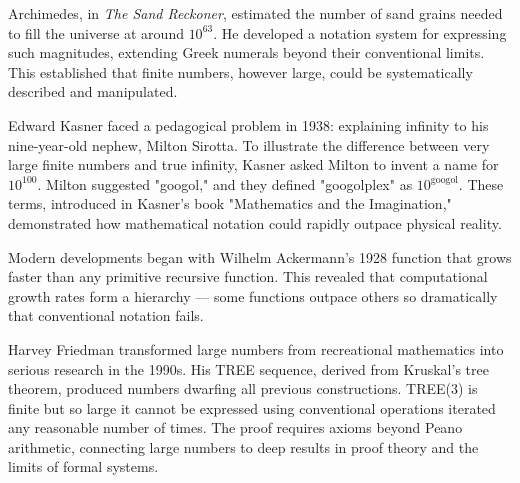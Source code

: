 Archimedes, in \textit{The Sand Reckoner}, estimated the number of sand grains needed to fill the universe at around $10^{63}$. He developed a notation system for expressing such magnitudes, extending Greek numerals beyond their conventional limits. This established that finite numbers, however large, could be systematically described and manipulated.

Edward Kasner faced a pedagogical problem in 1938: explaining infinity to his nine-year-old nephew, Milton Sirotta. To illustrate the difference between very large finite numbers and true infinity, Kasner asked Milton to invent a name for $10^{100}$. Milton suggested "googol," and they defined "googolplex" as $10^{\text{googol}}$. These terms, introduced in Kasner's book "Mathematics and the Imagination," demonstrated how mathematical notation could rapidly outpace physical reality.

Modern developments began with Wilhelm Ackermann's 1928 function that grows faster than any primitive recursive function. This revealed that computational growth rates form a hierarchy — some functions outpace others so dramatically that conventional notation fails.

Harvey Friedman transformed large numbers from recreational mathematics into serious research in the 1990s. His TREE sequence, derived from Kruskal's tree theorem, produced numbers dwarfing all previous constructions. TREE(3) is finite but so large it cannot be expressed using conventional operations iterated any reasonable number of times. The proof requires axioms beyond Peano arithmetic, connecting large numbers to deep results in proof theory and the limits of formal systems.
